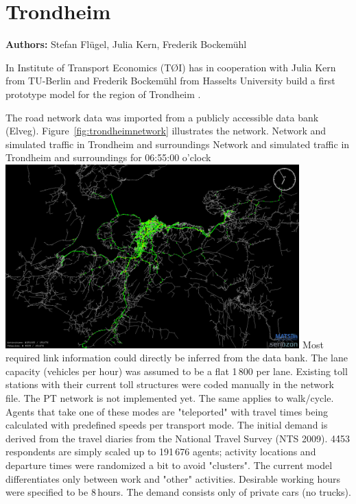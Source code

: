 \section{Trondheim}
\label{sec:trondheim}
\hfill \textbf{Authors:} Stefan Flügel, Julia Kern, Frederik Bockemühl

In Institute of Transport Economics (TØI) has in cooperation with Julia Kern from TU-Berlin and Frederik Bockemühl from Hasselts University build a first prototype model for the region of Trondheim \citep[][]{FluegelKern_unpub_WTS_2014}.

The road network data was imported from a publicly accessible data bank (Elveg). Figure~\ref{fig:trondheimnetwork} illustrates the network. 
%
\createfigure%
{Network and simulated traffic in Trondheim and surroundings}%
{Network and simulated traffic in Trondheim and surroundings for 06:55:00 o'clock \citep[source][]{FluegelEtAl_Samferdsel_2014}}%
{\label{fig:trondheimnetwork}}%
{\includegraphics[width=0.85\textwidth, angle=0]{./using/figures/trondheimnetwork.png}}%
{}
%
Most required link information could directly be inferred from the data bank. The lane capacity (vehicles per hour) was assumed to be a flat 1\,800 per lane. Existing toll stations with their current toll structures were coded manually in the network file. The PT network is not implemented yet. The same applies to walk/cycle. Agents that take one of these modes are "teleported" with travel times being calculated with predefined speeds per transport mode. 
The initial demand is derived from the travel diaries from the National Travel Survey (NTS 2009). 4\'453 respondents are simply scaled up to 191\,676 agents; activity locations and departure times were randomized a bit to avoid "clusters". The current model differentiates only between work and "other" activities. Desirable working hours were specified to be 8\,hours. The demand consists only of private cars (no trucks). 

